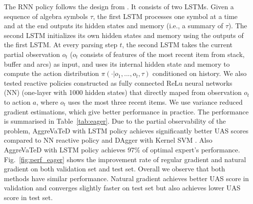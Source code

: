 \documentclass{article}
\begin{document}
The RNN policy follows the design from \cite{sutskever2014sequence}. It consists of two LSTMs. Given a sequence of algebra symbols $\tau$, the first LSTM processes one symbol at a time and at the end outputs its hidden states and memory (i.e., a summary of $\tau$). The second LSTM initializes its own hidden states and memory using the outputs of the first LSTM. At every parsing step $t$, the second LSTM takes the current partial observation $o_t$ ($o_t$ consists of features of the most recent item from stack, buffer and arcs) as input, and uses its internal hidden state and memory to compute the action distribution $\pi(\cdot|o_1,...,o_t,\tau)$ conditioned on history. We also tested reactive policies constructed as fully connected ReLu neural networks (NN) (one-layer with 1000 hidden states) that directly maped from observation $o_t$ to action $a$, where $o_t$ uses the most three recent items. We use variance reduced gradient estimations, which give better performance in practice. The performance is summarised in Table~\ref{tab:eager}. Due to the partial observability of the problem, AggreVaTeD with LSTM policy achieves significantly better UAS scores compared to NN reactive policy and DAgger with Kernel SVM \cite{duyckpredicting}. Also AggreVaTeD with LSTM policy achieves 97$\%$ of optimal expert's performance. Fig.~\ref{fig:perf_eager} shows the improvement rate of regular gradient and natural gradient on both validation set and test set. Overall we observe that both methods have similar performance. Natural gradient achieves better UAS score in validation and converges slightly faster on test set but also achieves lower UAS score in test set. 


\end{document}
